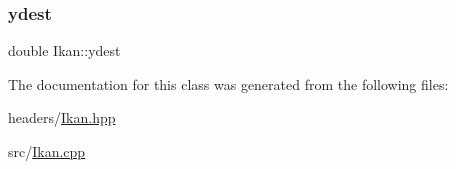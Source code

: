 \mbox{\label{class_ikan_ac338da0dc5dd61ec09b279200f94d328}} 
\subsubsection{\texorpdfstring{ydest}{ydest}}
{\footnotesize\ttfamily double Ikan\+::ydest\hspace{0.3cm}{\ttfamily [protected]}}



The documentation for this class was generated from the following files\+:\begin{DoxyCompactItemize}
\item 
headers/\mbox{\hyperlink{_ikan_8hpp}{Ikan.\+hpp}}\item 
src/\mbox{\hyperlink{_ikan_8cpp}{Ikan.\+cpp}}\end{DoxyCompactItemize}

